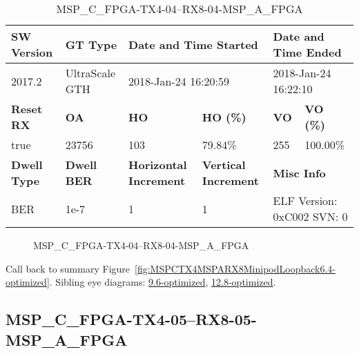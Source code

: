 \begin{table}[h]
\centering
\caption{MSP\_C\_FPGA-TX4-04--RX8-04-MSP\_A\_FPGA}
\label{tab:MSPCFPGATX404RX804MSPAFPGA6.4-optimized}
\begin{tabular}{@{}|l|l|l|l|l|l|@{}}
\toprule
\textbf{SW Version}                & \textbf{GT Type}   & \multicolumn{2}{l|}{\textbf{Date and Time Started}}            & \multicolumn{2}{l|}{\textbf{Date and Time Ended}}        \\ \midrule
2017.2                       & UltraScale GTH          & \multicolumn{2}{l|}{2018-Jan-24 16:20:59}                   & \multicolumn{2}{l|}{2018-Jan-24 16:22:10}               \\ \midrule
\textbf{Reset RX}                  & \textbf{OA} & \textbf{HO}   & \textbf{HO (\%)} & \textbf{VO} & \textbf{VO (\%)} \\ \midrule
true & 23756        & 103          & 79.84\%        & 255        & 100.00\%       \\ \midrule
\textbf{Dwell Type}                & \textbf{Dwell BER} & \textbf{Horizontal Increment} & \textbf{Vertical Increment}    & \multicolumn{2}{l|}{\textbf{Misc Info}}                  \\ \midrule
BER                            & 1e-7        & 1        & 1           & \multicolumn{2}{l|}{ELF Version: 0xC002 SVN: 0}                         \\ \bottomrule
\end{tabular}
\end{table}

\begin{figure}[h]
\caption{MSP\_C\_FPGA-TX4-04--RX8-04-MSP\_A\_FPGA} \label{fig:MSPCFPGATX404RX804MSPAFPGA6.4-optimized}
\end{figure}

Call back to summary Figure~\ref{fig:MSPCTX4MSPARX8MinipodLoopback6.4-optimized}.
Sibling eye diagrams: \hyperref[sec:MSPCFPGATX404RX804MSPAFPGA9.6-optimized]{9.6-optimized}, \hyperref[sec:MSPCFPGATX404RX804MSPAFPGA12.8-optimized]{12.8-optimized}.

\clearpage
\newpage


\subsection{MSP\_C\_FPGA-TX4-05--RX8-05-MSP\_A\_FPGA}\label{sec:MSPCFPGATX405RX805MSPAFPGA6.4-optimized}

